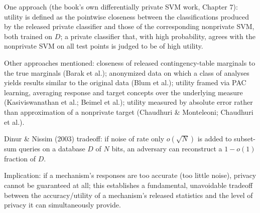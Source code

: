 \documentclass[10pt]{extarticle}
\newcommand{\resposta}[1]{\par\smallskip\noindent #1}
\begin{document}
\begin{questoes}
\resposta{
\begin{topicos}
\item One approach (the book's own differentially private SVM work, Chapter 7): utility is defined as the pointwise closeness between the classifications produced by the released private classifier and those of the corresponding nonprivate SVM, both trained on $D$; a private classifier that, with high probability, agrees with the nonprivate SVM on all test points is judged to be of high utility.
\item Other approaches mentioned: closeness of released contingency-table marginals to the true marginals (Barak et al.); anonymized data on which a class of analyses yields results similar to the original data (Blum et al.); utility framed via PAC learning, averaging response and target concepts over the underlying measure (Kasiviswanathan et al.; Beimel et al.); utility measured by absolute error rather than approximation of a nonprivate target (Chaudhuri \& Monteleoni; Chaudhuri et al.).
\item Dinur \& Nissim (2003) tradeoff: if noise of rate only $o(\sqrt{N})$ is added to subset-sum queries on a database $D$ of $N$ bits, an adversary can reconstruct a $1-o(1)$ fraction of $D$.
\item Implication: if a mechanism's responses are too accurate (too little noise), privacy cannot be guaranteed at all; this establishes a fundamental, unavoidable tradeoff between the accuracy/utility of a mechanism's released statistics and the level of privacy it can simultaneously provide.
\end{topicos}
}

\end{questoes}
\end{document}
